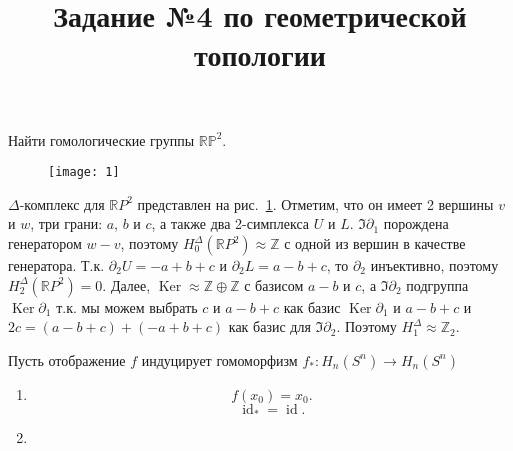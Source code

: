 \documentclass[a4paper]{article}
\title{Задание №4 по геометрической топологии}
\begin{document}
	\maketitle
\begin{hiProb}[Задача 1]
	Найти гомологические группы $\mathbb{R}\mathbb{P}^2$.
\end{hiProb}
\begin{sol}
%
%
\begin{figure}[htpb]
	\centering
	\texttt{[image: 1]}
	\caption{}
	\label{fig:1}
\end{figure}
$\Delta$-комплекс для $\mathbb{R}P^2$ представлен на рис.~\ref{fig:1}. Отметим, что он имеет 2 вершины $v$ и $w$, три грани:
$a$, $b$ и $c$, а также два 2-симплекса $U$ и $L$. $\Im \partial_1$ порождена генератором $w-v$, поэтому $H_0^\Delta(\mathbb{R}P^2)
 \approx \mathbb{Z}$ с одной из вершин в качестве генератора.
Т.\:к. $\partial_2 U=-a+b+c$ и $\partial_2 L=a-b+c$, то
$\partial_2$ инъективно, поэтому $H_2^\Delta(\mathbb{R}P^2)=0$.
Далее, $\operatorname{Ker}\approx \mathbb{Z}\oplus \mathbb{Z}$ 
с базисом $a-b$ и $c$, а $\Im \partial_2$ подгруппа $\operatorname{Ker}\partial_1$ т.\:к. мы можем выбрать $c$ и $a-b+c$ как
базис $\operatorname{Ker}\partial_1$ и $a-b+c$ и $2c=(a-b+c)+
(-a+b+c)$ как базис для $\Im \partial_2$. Поэтому $H_1^\Delta
 \approx \mathbb{Z}_2$.
\end{sol}
	Пусть отображение $f$ индуцирует гомоморфизм  $f_*\colon H_n(S^n)\to H_n
	(S^n)$ 
\begin{enumerate}
\item \[
		f(x_0)=x_0
.\] 
\[
	\operatorname{id}_*=\operatorname{id}
.\] 
\item 
\end{enumerate}
\end{document}
